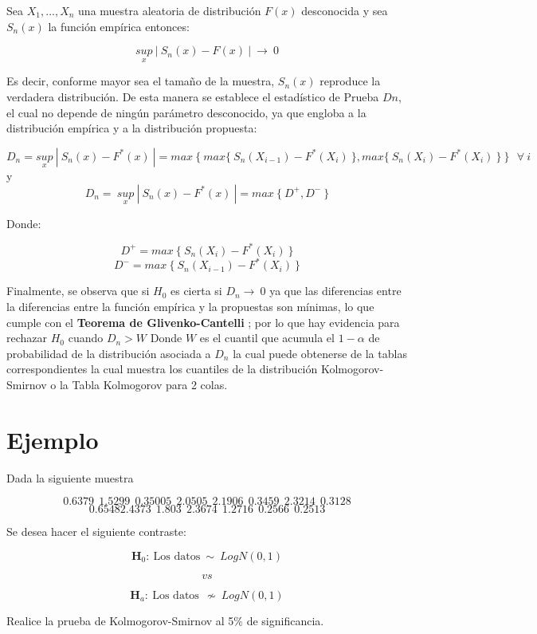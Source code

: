 \documentclass[
  a4paper,
  oneside,
  openany]{book}
\begin{document}
Sea \(X_{1},\ldots,X_{n}\) una muestra aleatoria de distribución \(F(x)\) desconocida y sea \(S_{n}(x)\) la función empírica entonces:

\[\underset{x}{sup} \ |\ S_{n}(x)-F(x) \ | \ \longrightarrow \ 0\]

Es decir, conforme mayor sea el tamaño de la muestra, \(S_{n}(x)\) reproduce la verdadera
distribución. De esta manera se establece el estadístico de Prueba \(Dn\), el cual no depende de ningún
parámetro desconocido, ya que engloba a la distribución empírica y a la distribución propuesta:

\[D_{n}=\underset{x}{sup} \ | \ S_{n}(x)-F^*(x) \ |=max \  \{ \ max \{ \  S_{n}(X_{i-1})-F^*(X_{i}) \ \},max \{ \  S_{n}(X_{i})-F^*(X_{i}) \ \} \ \} \ \  \ \forall \ i\]
y \[D_{n}= \ \underset{x}{sup} \ | \ S_{n}(x)-F^*(x) \ |=max \ \{ \  D^+,D^- \ \}\]

Donde:

\[D^+= max \ \{ \  S_{n}(X_{i})-F^*(X_{i}) \ \}\]
\[D^-= max \  \{ \ S_{n}(X_{i-1})-F^*(X_{i}) \ \}\]

Finalmente, se observa que si \(H_0\) es cierta si \(D_{n} \longrightarrow \ 0\) ya que las diferencias entre la diferencias entre la función empírica y la propuestas son mínimas, lo que cumple con el \textbf{Teorema de Glivenko-Cantelli} ; por lo que hay evidencia para rechazar \(H_0\) cuando \(D_{n} > W\) Donde \(W\) es el cuantil que acumula el \(1- \alpha\) de probabilidad de la distribución asociada a \(D_{n}\) la cual puede obtenerse de la tablas correspondientes la cual muestra los cuantiles de la distribución
Kolmogorov-Smirnov o la Tabla Kolmogorov para 2 colas.

\hypertarget{ejemplo-12}{%
\section{Ejemplo}\label{ejemplo-12}}

Dada la siguiente muestra

\[0.6379 \ \ 1.5299 \ \ 0.35005 \ \ 2.0505 \ \ 2.1906 \ \ 0.3459 \ \ 2.3214 \ \ 0.3128\]
\[ 0.65482.4373 \ \ 1.803 \ \ 2.3674 \ \ 1.2716 \ \ 0.2566 \ \ 0.2513\]

Se desea hacer el siguiente contraste:

\[\textbf{H}_0: \ \mbox{Los datos} \  \sim  \ LogN(0,1)\]

\[vs\]

\[\textbf{H}_a: \ \mbox{Los datos} \ \ \nsim \ LogN(0,1)\]

Realice la prueba de Kolmogorov-Smirnov al 5\% de significancia.
\end{document}
